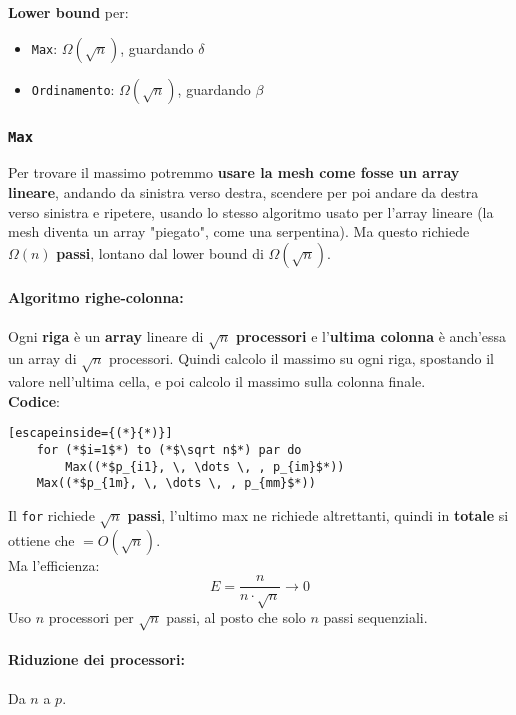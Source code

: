 \textbf{Lower bound} per: 
\begin{itemize}
	\item \texttt{Max}: $\Omega (\sqrt{n})$, guardando $\delta$
	\item \texttt{Ordinamento}: $\Omega (\sqrt{n})$, guardando $\beta$
\end{itemize}

\newpage

\subsubsection{\texttt{Max}}
Per trovare il massimo potremmo \textbf{usare la mesh come fosse un array lineare}, andando da sinistra verso destra, scendere per poi andare da destra verso sinistra e ripetere, usando lo stesso algoritmo usato per l'array lineare (la mesh diventa un array "piegato", come una serpentina). Ma questo richiede $\Omega (n)$ \textbf{passi}, lontano dal lower bound di $\Omega (\sqrt{n})$.\\

\paragraph{Algoritmo righe-colonna:} Ogni \textbf{riga} è un \textbf{array} lineare di $\sqrt{n}$ \textbf{processori} e l'\textbf{ultima colonna} è anch'essa un array di $\sqrt{n}$ processori. Quindi calcolo il massimo su ogni riga, spostando il valore nell'ultima cella, e poi calcolo il massimo sulla colonna finale.\\

\textbf{Codice}: 
\begin{lstlisting}[escapeinside={(*}{*)}]
	for (*$i=1$*) to (*$\sqrt n$*) par do
		Max((*$p_{i1}, \, \dots \, , p_{im}$*))
	Max((*$p_{1m}, \, \dots \, , p_{mm}$*))
\end{lstlisting}

Il \texttt{for} richiede $\sqrt{n}$ \textbf{passi}, l'ultimo max ne richiede altrettanti, quindi in \textbf{totale} si ottiene che $= O (\sqrt{n})$.\\

Ma l'efficienza: 
$$ 
E = \frac{n}{n \cdot \sqrt{n}} \rightarrow 0
$$
Uso $n$ processori per $\sqrt{n}$ passi, al posto che solo $n$ passi sequenziali.\\


\newpage

\paragraph{Riduzione dei processori:} Da $n$ a $p$.\\

